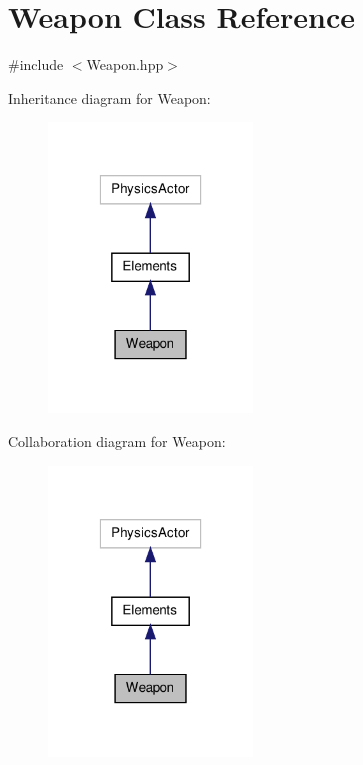\hypertarget{class_weapon}{\section{Weapon Class Reference}
\label{class_weapon}
}


{\ttfamily \#include $<$Weapon.\-hpp$>$}



Inheritance diagram for Weapon\-:
\nopagebreak
\begin{figure}[H]
\begin{center}
\leavevmode
\includegraphics[width=154pt]{class_weapon__inherit__graph}
\end{center}
\end{figure}


Collaboration diagram for Weapon\-:
\nopagebreak
\begin{figure}[H]
\begin{center}
\leavevmode
\includegraphics[width=154pt]{class_weapon__coll__graph}
\end{center}
\end{figure}
